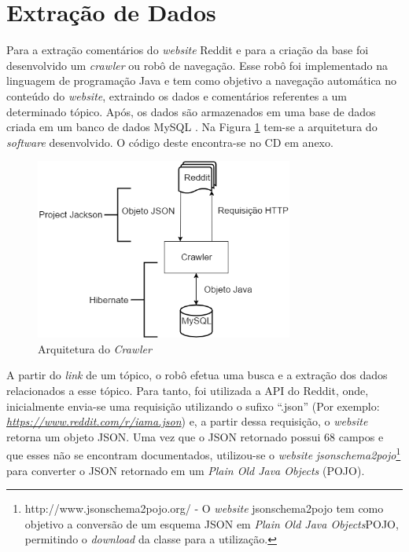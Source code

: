 \section{Extração de Dados}
\label{cap:Extracao}

Para a extração comentários do \textit{website} Reddit e para a criação da base
foi desenvolvido um \textit{crawler} ou robô de navegação. Esse robô foi
implementado na linguagem de programação Java e tem como objetivo a navegação
automática no conteúdo do \textit{website}, extraindo os dados e comentários referentes a um
determinado tópico. Após, os dados são armazenados em uma base de dados criada
em um banco de dados MySQL \cite{Widenius:2002:MRM:560480}.
Na Figura \ref{fig:crawler} tem-se a arquitetura do \textit{software}
desenvolvido. O código deste encontra-se no CD em anexo.

\begin{figure}[htbp]
\centering
\includegraphics[height=225px]{imagens/arquitetura.png}
\caption{Arquitetura do \textit{Crawler}}
\label{fig:crawler}
\end{figure}

A partir do \textit{link} de um tópico, o robô efetua uma busca e a
extração dos dados relacionados a esse tópico. Para tanto, foi utilizada a
\ac{API} do Reddit, onde, inicialmente envia-se uma requisição utilizando o
sufixo ``.json'' (Por exemplo:
\textit{\url{https://www.reddit.com/r/iama.json}}) e, a partir dessa requisição,
o \textit{website} retorna um objeto \ac{JSON}. Uma vez que o \ac{JSON}
retornado possui 68 campos e que esses não se encontram
documentados, utilizou-se o \textit{website}
\textit{jsonschema2pojo}\footnote{http://www.jsonschema2pojo.org/ - O
\textit{website} jsonschema2pojo tem como objetivo a conversão de um esquema \ac{JSON} em
\textit{Plain Old Java Objects}\ac{POJO}, permitindo o \textit{download} da classe para a utilização.} para converter o
JSON retornado em um \textit{Plain Old Java Objects} (\ac{POJO}).


